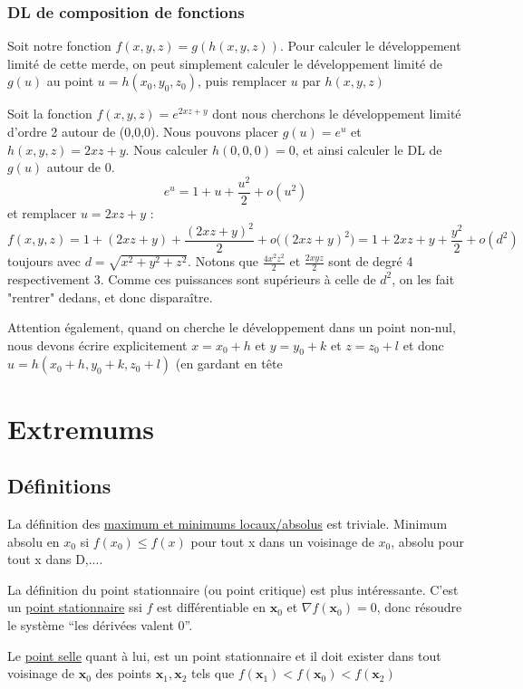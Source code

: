 \documentclass[12pt,a4paper]{article}
\renewcommand{\)}{\right)}
\renewcommand{\(}{\left(}
\begin{document}
\subsubsection{DL de composition de fonctions}
Soit notre fonction $f(x,y,z) = g(h(x,y,z))$. Pour calculer le développement limité de cette merde, on peut simplement calculer le développement limité de $g(u)$ au point $u = h(x_0,y_0,z_0)$, puis remplacer $u$ par $h(x,y,z)$
\begin{exemple}
	Soit la fonction $f(x,y,z) = e^{2xz + y}$ dont nous cherchons le développement limité d'ordre 2 autour de (0,0,0). Nous pouvons placer $g(u) = e^u$ et $h(x,y,z) = 2xz + y$. Nous calculer $h(0,0,0) = 0$, et ainsi calculer le DL de $g(u)$ autour de 0.
	\[e^u = 1 + u + \frac{u^2}{2} + o(u^2)\]
	et remplacer $u = 2xz +  y$ :
	\[f(x,y,z) = 1 + (2xz + y) + \frac{(2xz + y)^2}{2} + o\big((2xz + y)^2\big) = 1 + 2xz + y + \frac{y^2}{2} + o(d^2)\]
	toujours avec $d = \sqrt{x^2 + y^2 + z^2}$. Notons que $\frac{4x^2z^2}{2}$ et $\frac{2xyz}{2}$  sont de degré 4 respectivement 3. Comme ces puissances sont supérieurs à celle de $d^2$, on les fait "rentrer" dedans, et donc disparaître.
\end{exemple}
Attention également, quand on cherche le développement dans un point non-nul, nous devons écrire explicitement $x = x_0 + h$ et $y = y_0 + k$ et $z = z_0 + l$ et donc $u = h(x_0 + h,y_0+k,z_0 + l)$ (en gardant en tête

\section{Extremums}
\subsection{Définitions}
La définition des \uline{maximum et minimums locaux/absolus} est triviale. Minimum absolu en $x_0$ si $f(x_0) \leq f(x)$  pour tout x dans un voisinage de $x_0$, absolu pour tout x dans D,....

La définition du point stationnaire (ou point critique) est plus intéressante. C'est un \uline{point stationnaire} ssi $f$ est différentiable en $\textbf{x}_0$ et $\nabla f(\textbf{x}_0) = 0$, donc résoudre le système \enquote{les dérivées valent 0}.

Le \uline{point selle} quant à lui, est un point stationnaire et il doit exister dans tout voisinage de $\textbf{x}_0$  des points $\textbf{x}_1,\textbf{x}_2$ tels que $f(\textbf{x}_1) < f(\textbf{x}_0) < f(\textbf{x}_2)$
\end{document}
